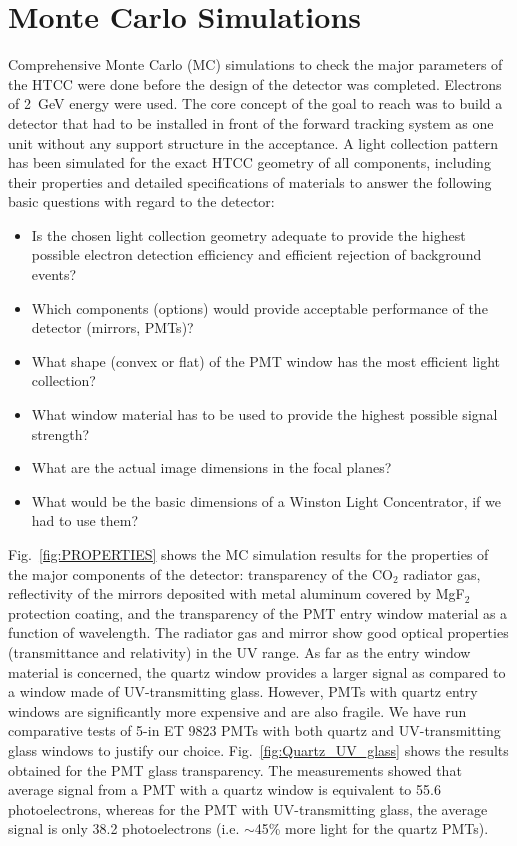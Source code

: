 \section{Monte Carlo Simulations}
\label{htcc-sim-sec}

Comprehensive Monte Carlo (MC) simulations to check the major parameters of the HTCC were done before the
design of the detector was completed. Electrons of 2~GeV energy were used. The core concept of the goal to
reach was to build a detector that had to be installed in front of the forward tracking system as one unit without
any support structure in the acceptance. A light collection pattern has been simulated for the exact HTCC
geometry of all components, including their properties and detailed  specifications of materials to answer the
following basic questions with regard to the detector:

\begin{itemize}
\item Is the chosen light collection geometry adequate to provide the highest possible electron detection efficiency
  and efficient rejection of background events?
\item Which components (options) would provide acceptable performance of the detector (mirrors, PMTs)?
\item What shape (convex or flat) of the PMT window has the most efficient light collection?
\item What window material has to be used to provide the highest possible signal strength?
\item What are the actual image dimensions in the focal planes?
\item What would be the basic dimensions of a Winston Light Concentrator, if we had to use them?
\end{itemize}

Fig.~\ref{fig:PROPERTIES} shows the MC simulation results for the properties of the major components of the
detector: transparency of the CO$_2$ radiator gas, reflectivity of the mirrors deposited with metal aluminum
covered by MgF$_2$ protection coating, and the transparency of the PMT entry window material as a function of
wavelength. The radiator gas and mirror show good optical properties (transmittance and relativity) in the UV
range. As far as the entry window material is concerned, the quartz window provides a larger signal as compared
to a window made of UV-transmitting glass. However, PMTs with quartz entry windows are significantly more
expensive and are also fragile. We have run comparative tests of 5-in ET 9823 PMTs with both quartz and
UV-transmitting glass windows to justify our choice. Fig.~\ref{fig:Quartz_UV_glass} shows the results obtained
for the PMT glass transparency. The measurements showed that average signal from a PMT with a quartz window
is equivalent to 55.6 photoelectrons, whereas for the PMT with UV-transmitting glass, the average signal is only
38.2 photoelectrons (i.e. $\sim$45\% more light for the quartz PMTs).

